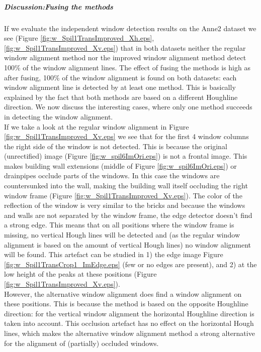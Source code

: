 \subparagraph{Discussion:Fusing the methods}
If we evaluate the independent window detection results on the Anne2 dataset we see (Figure
\ref{fig:w_Spil1TransImproved_Xh.eps}, \ref{fig:w_Spil1TransImproved_Xv.eps})
that in both datasets neither the regular window alignment method nor the
improved window alignment method detect 100\% of the window alignment lines.  The
effect of fusing the methods is high as after fusing, 100\% of the window
alignment is found on both datasets: each window alignment line is detected by
at least one method.  This is basically explained by the fact that both methods
are based on a different Houghline direction.  We now discuss the interesting
cases, where only one method succeeds in detecting the window alignment.\\

\label{lab:occlusion} If we take a look at the regular window alignment in
Figure \ref{fig:w_Spil1TransImproved_Xv.eps} we see that for the first 4 window
columns the right side of the window is not detected.  This is because the
original (unrectified) image (Figure \ref{fig:w_spil6ImOri.eps}) is not a
frontal image.  This makes building wall extensions (middle of Figure
\ref{fig:w_spil6ImOri.eps}) or drainpipes occlude parts of the windows.  In this
case the windows are countersunked into the wall, making the building wall itself
occluding the right window frame (Figure \ref{fig:w_Spil1TransImproved_Xv.eps}).
The color of the reflection of the window is very similar to the bricks and
because the windows and walls are not separated by the window frame, the edge
detector doesn't find a strong edge.  This means that on all positions where the
window frame is missing, no vertical Hough lines will be detected and (as the
regular window alignment is based on the amount of vertical Hough lines) no window
alignment will be found.  This artefact can be studied in 1) the edge image Figure
\ref{fig:w_Spil1TransCrop1_ImEdge.eps} (few or no edges are present), and 2) at the
low height of the peaks at these positions (Figure
\ref{fig:w_Spil1TransImproved_Xv.eps}).\\

However, the alternative window alignment does find a window alignment on these
positions. This is because the method is based on the opposite Houghline
direction: for the vertical window alignment the horizontal Houghline direction
is taken into account.  This occlusion artefact has no effect on the horizontal
Hough lines, which makes the alternative window alignment method a strong
alternative for the alignment of (partially) occluded windows.\\

